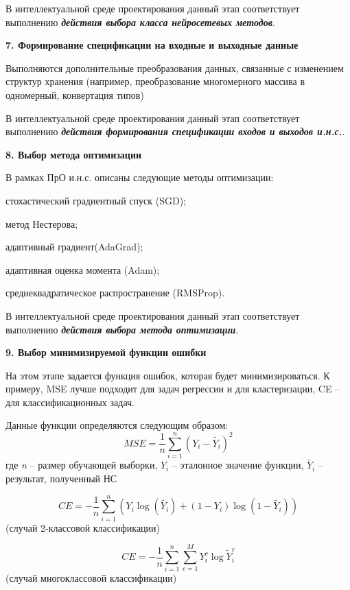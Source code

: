 В интеллектуальной среде проектирования данный этап соответствует выполнению \textbf{\textit{действия выбора класса нейросетевых методов}}.


\textbf{7. Формирование спецификации на входные и выходные данные}

Выполняются дополнительные преобразования данных, связанные с изменением структур хранения (например, преобразование многомерного массива в одномерный, конвертация типов)

В интеллектуальной среде проектирования данный этап соответствует выполнению \textbf{\textit{действия формирования спецификации входов и выходов и.н.с.}}.


\textbf{8. Выбор метода оптимизации }

В рамках ПрО и.н.с. описаны следующие методы оптимизации:
\begin{textitemize}
	\item стохастический градиентный спуск (SGD);
	\item метод Нестерова;
	\item адаптивный градиент(AdaGrad);
	\item адаптивная оценка момента (Adam);
	\item среднеквадратическое распространение (RMSProp).
\end{textitemize}

В интеллектуальной среде проектирования данный этап соответствует выполнению \textbf{\textit{действия выбора метода оптимизации}}.


\textbf{9. Выбор минимизируемой функции ошибки}

На этом этапе задается функция ошибок, которая будет минимизироваться. К примеру, MSE лучше подходит для задач регрессии и для кластеризации, CE -- для классификационных задач.

Данные функции определяются следующим образом:
\begin{equation*}
	MSE = \frac{1}{n} \sum_{i=1}^n (Y_i - \widetilde{Y_i})^2
\end{equation*}
где \textit{n} -- размер обучающей выборки, $Y_i$ -- эталонное значение функции, $\widetilde{Y_i}$ -- результат, полученный НС

\begin{equation*}
	CE = - \frac{1}{n} \sum_{i=1}^n (Y_i\log(\widetilde{Y_i}) + (1-Y_i)\log(1 - \widetilde{Y_i}))
\end{equation*}
(случай 2-классовой классификации)

\begin{equation*}
	CE = - \frac{1}{n} \sum_{i=1}^n \sum_{c=1}^M Y_i^c \log{\widetilde{Y}_i^c}
\end{equation*}
(случай многоклассовой классификации)

